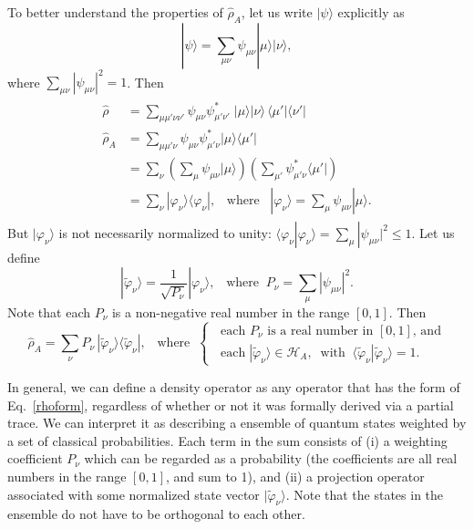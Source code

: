 \documentclass[pra,12pt]{revtex4}
\begin{document}
To better understand the properties of $\hat{\rho}_A$, let us write
$|\psi\rangle$ explicitly as
\begin{equation}
  |\psi\rangle = \sum_{\mu\nu} \psi_{\mu\nu} |\mu\rangle |\nu\rangle,
\end{equation}
where $\sum_{\mu\nu} |\psi_{\mu\nu}|^2 = 1$.  Then
\begin{align}
  \begin{aligned}
    \hat{\rho} &= \sum_{\mu\mu'\nu\nu'} \psi_{\mu\nu}
    \psi_{\mu'\nu'}^* \; |\mu\rangle |\nu\rangle \,
    \langle\mu'|\langle \nu'| \\
    \hat{\rho}_A &= \sum_{\mu\mu'\nu} \psi_{\mu\nu}\psi_{\mu'\nu}^* |\mu\rangle
    \langle\mu'| \\
    &= \sum_\nu \left(\sum_\mu \psi_{\mu\nu} |\mu\rangle\right)
    \left(\sum_{\mu'} \psi_{\mu'\nu}^*\langle\mu'|\right) \\
    &= \sum_\nu |\varphi_\nu\rangle \langle \varphi_\nu|,
    \;\;\;\mathrm{where}\;\;\;
    |\varphi_\nu\rangle = \sum_\mu \psi_{\mu\nu} |\mu\rangle.
  \end{aligned}
\end{align}
But $|\varphi_\nu\rangle$ is not necessarily normalized to unity:
$\langle \varphi_\nu | \varphi_\nu\rangle =
\sum_{\mu}|\psi_{\mu\nu}|^2 \le 1$.  Let us define
\begin{equation}
  |\tilde{\varphi}_\nu\rangle = \frac{1}{\sqrt{P_\nu}} |\varphi_\nu\rangle,
  \;\;\;\mathrm{where} \;\; P_\nu = \sum_{\mu}|\psi_{\mu\nu}|^2.
\end{equation}
Note that each $P_\nu$ is a non-negative real number in the range
$[0,1]$.  Then
\begin{equation}
  \hat{\rho}_A = \sum_\nu P_\nu\, |\tilde{\varphi}_\nu\rangle
  \langle \tilde{\varphi}_\nu|,
  \;\;\;\mathrm{where}\;\;
  \begin{cases}
    \;\;\textrm{each $P_\nu$ is a real number in $[0,1]$, and} \\
    \;\;\textrm{each}\; |\tilde{\varphi}_\nu\rangle \in \mathscr{H}_A,
    \;\;\mathrm{with}
    \;\;\langle\tilde{\varphi}_\nu|\tilde{\varphi}_\nu\rangle = 1.
  \end{cases}
  \label{rhoform}
\end{equation}

In general, we can define a density operator as any operator that has
the form of Eq.~\eqref{rhoform}, regardless of whether or not it was
formally derived via a partial trace.  We can interpret it as
describing a ensemble of quantum states weighted by a set of classical
probabilities.  Each term in the sum consists of (i) a weighting
coefficient $P_\nu$ which can be regarded as a probability (the
coefficients are all real numbers in the range $[0,1]$, and sum to 1),
and (ii) a projection operator associated with some normalized state
vector $|\tilde{\varphi}_\nu\rangle$.  Note that the states in the
ensemble do not have to be orthogonal to each other.
\end{document}
